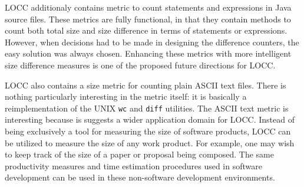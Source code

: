 LOCC additionaly contains metric to count statements and expressions in
Java source files.  These metrics are fully functional, in that they
contain methods to count both total size and size difference in terms of
statements or expressions.  However, when decisions had to be made in
designing the difference counters, the easy solution was always chosen.
Enhancing these metrics with more intelligent size difference measures is
one of the proposed future directions for LOCC.

LOCC also contains a size metric for counting plain ASCII text files.
There is nothing particularly interesting in the metric itself: it is
basically a reimplementation of the UNIX {\tt wc} and {\tt diff}
utilities.  The ASCII text metric is interesting because is suggests a
wider application domain for LOCC.  Instead of being exclusively a tool for 
measuring the size of software products, LOCC can be utilized to measure
the size of any work product.  For example, one may wish to keep track of
the size of a paper or proposal being composed.  The same productivity
measures and time estimation procedures used in software development can be 
used in these non-software development environments.  

